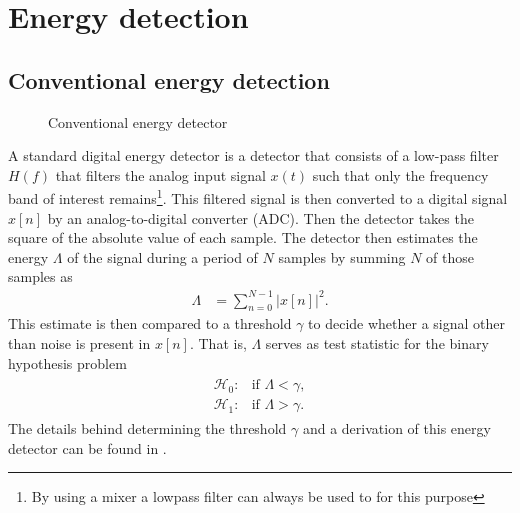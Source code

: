 \documentclass[a4paper, openany, oneside]{memoir}
\begin{document}
\section{Energy detection}

\subsection{Conventional energy detection}\label{sec:conv_ed}
\begin{figure}[H]
\centering
{}
\caption{Conventional energy detector}\label{tkz:conv_ed}
\end{figure}
A standard digital energy detector is a detector that consists of a low-pass filter $H(f)$ that filters the analog input signal $x(t)$ such
that only the frequency band of interest remains\footnote{By using a mixer a lowpass filter can always be used to for this purpose}. This filtered signal is then converted to a digital signal $x[n]$ by an analog-to-digital converter (ADC). Then the detector takes the square of the absolute value of each sample. The detector then estimates the energy $\Lambda$ of the signal during a period of $N$ samples by summing $N$ of those samples as
\begin{align}\label{eq:test_ed}
	\Lambda &= \sum_{n=0}^{N-1} |x[n]|^2.
\end{align}
This estimate is then compared to a threshold $\gamma$ to decide whether a signal other than noise is present in $x[n]$. That is, $\Lambda$ serves as test statistic for the binary hypothesis problem
\begin{align*}
	\begin{array}{ll}
		\mathcal{H}_0: & \text{if } \Lambda < \gamma, \\
		\mathcal{H}_1: & \text{if } \Lambda > \gamma.
	\end{array}
\end{align*}
The details behind determining the threshold $\gamma$ and a derivation of this energy detector can be found in .
\end{document}
